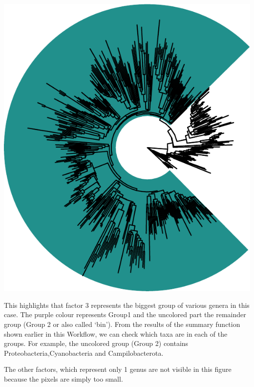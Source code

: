 \documentclass[
]{book}
\newenvironment{Shaded}{\begin{snugshade}}{\end{snugshade}}
\newcommand{\DecValTok}[1]{\textcolor[rgb]{0.00,0.00,0.81}{#1}}
\newcommand{\FunctionTok}[1]{\textcolor[rgb]{0.00,0.00,0.00}{#1}}
\newcommand{\NormalTok}[1]{#1}
\newcommand{\OtherTok}[1]{\textcolor[rgb]{0.56,0.35,0.01}{#1}}
\newcommand{\SpecialCharTok}[1]{\textcolor[rgb]{0.00,0.00,0.00}{#1}}
\begin{document}
\begin{Shaded}
\end{Shaded}

\includegraphics{gitbook-demo_files/figure-latex/pfviz2-1.pdf}

This highlights that factor 3 represents the biggest group of various genera in this case. The purple colour represents Group1 and the uncolored part the remainder group (Group 2 or also called `bin'). From the results of the summary function shown earlier in this Workflow, we can check which taxa are in each of the groups. For example, the uncolored group (Group 2) contains Proteobacteria,Cyanobacteria and Campilobacterota.

The other factors, which represent only 1 genus are not visible in this figure because the pixels are simply too small.
\end{document}

